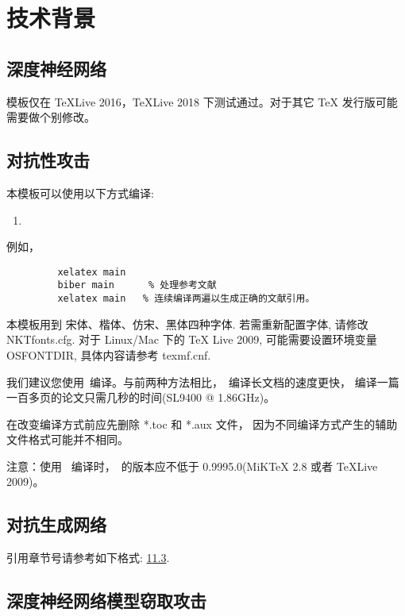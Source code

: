

\chapter{技术背景} 
\label{chpt:relatedwork}

\section{深度神经网络}

模板仅在 TeXLive 2016，TeXLive 2018 下测试通过。对于其它 TeX 发行版可能需要做个别修改。

\section{对抗性攻击}

本模板可以使用以下方式编译:
\begin{enumerate}
 \item \XeLaTeX [推荐]
\end{enumerate}

例如，
\begin{verbatim}
         xelatex main
         biber main      % 处理参考文献
         xelatex main   % 连续编译两遍以生成正确的文献引用。
\end{verbatim}





本模板用到 宋体、楷体、仿宋、黑体四种字体. 若需重新配置字体, 请修改 NKTfonts.cfg.
对于 Linux/Mac 下的 TeX Live 2009, 可能需要设置环境变量 OSFONTDIR, 具体内容请参考 texmf.cnf.


我们建议您使用\XeLaTeX\ 编译。与前两种方法相比，\XeLaTeX\  编译长文档的速度更快，
编译一篇一百多页的论文只需几秒的时间(SL9400 @ 1.86GHz)。

在改变编译方式前应先删除 *.toc 和 *.aux 文件，
因为不同编译方式产生的辅助文件格式可能并不相同。



注意：使用 \XeLaTeX\ 编译时，\XeTeX\ 的版本应不低于 0.9995.0(MiKTeX 2.8 或者 TeXLive 2009)。


\section{对抗生成网络}
\label{sec:ex:A}

引用章节号请参考如下格式: \ref{chpt:relatedwork}\ref{sec:ex:A}.


\section{深度神经网络模型窃取攻击}

